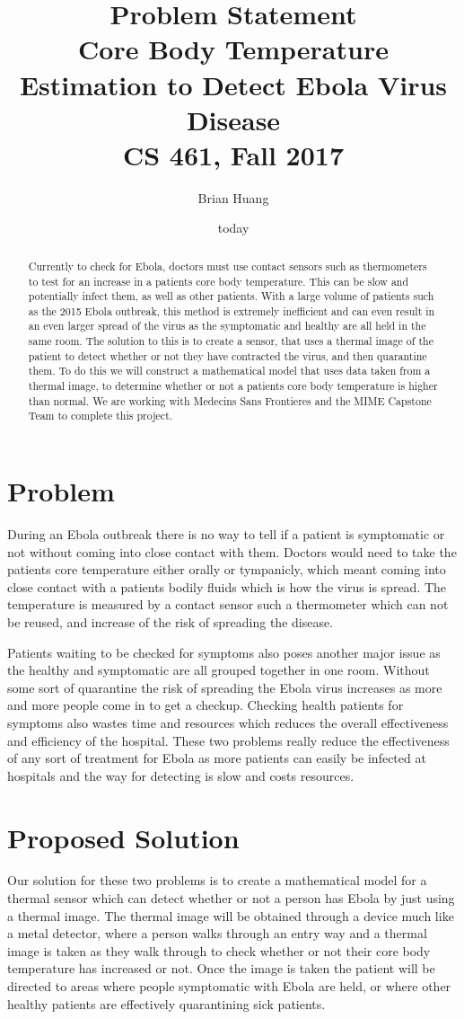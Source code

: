 \documentclass{article}
\title{%
  Problem Statement \\
  \large Core Body Temperature Estimation to Detect Ebola Virus Disease \\
  \large CS 461, Fall 2017\\
    }
\author{Brian Huang}
\date{today}
\begin{document}
\maketitle
\begin{abstract}
Currently to check for Ebola, doctors must use contact sensors such as thermometers to test for an increase in a patients core body temperature. This can be slow and potentially infect them, as well as other patients. With a large volume of patients such as the 2015 Ebola outbreak, this method is extremely inefficient and can even result in an even larger spread of the virus as the symptomatic and healthy are all held in the same room. The solution to this is to create a sensor, that uses a thermal image of the patient to detect whether or not they have contracted the virus, and then quarantine them. To do this we will construct a mathematical model that uses data taken from a thermal image, to determine whether or not a patients core body temperature is higher than normal. We are working with Medecins Sans Frontieres and the MIME Capstone Team to complete this project.
\end{abstract}
\newpage
\section{Problem}
During an Ebola outbreak there is no way to tell if a patient is symptomatic or not without coming into close contact with them. Doctors would need to take the patients core temperature either orally or tympanicly, which meant coming into close contact with a patients bodily fluids which is how the virus is spread. The temperature is measured by a contact sensor such a thermometer which can not be reused, and increase of the risk of spreading the disease.

Patients waiting to be checked for symptoms also poses another major issue as the healthy and symptomatic are all grouped together in one room. Without some sort of quarantine the risk of spreading the Ebola virus increases as more and more people come in to get a checkup. Checking health patients for symptoms also wastes time and resources which reduces the overall effectiveness and efficiency of the hospital. These two problems really reduce the effectiveness of any sort of treatment for Ebola as more patients can easily be infected at hospitals and the way for detecting is slow and costs resources.
\section{Proposed Solution}
Our solution for these two problems is to create a mathematical model for a thermal sensor which can detect whether or not a person has Ebola by just using a thermal image. The thermal image will be obtained through a device much like a metal detector, where a person walks through an entry way and a thermal image is taken as they walk through to check whether or not their core body temperature has increased or not. Once the image is taken the patient will be directed to areas where people symptomatic with Ebola are held, or where other healthy patients are effectively quarantining sick patients.
\end{document}

